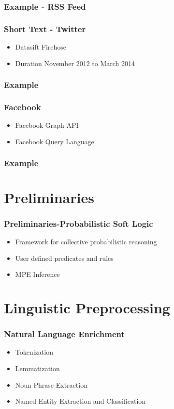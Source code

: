 \documentclass{beamer}
\begin{document}
\begin{frame}
    \frametitle{Example - RSS Feed}
\end{frame}

\begin{frame}
    \frametitle{Short Text - Twitter}
    \begin{itemize}
        \item
            Datasift Firehose
        \item
            Duration November 2012 to March 2014
    \end{itemize}
\end{frame}

\begin{frame}
    \frametitle{Example}
\end{frame}

\begin{frame}
    \frametitle{Facebook}
    \begin{itemize}
        \item
            Facebook Graph API
        \item
            Facebook Query Language
    \end{itemize}
\end{frame}

\begin{frame}
    \frametitle{Example}
\end{frame}

\section{Preliminaries}
\begin{frame}
\frametitle{Preliminaries-Probabilistic Soft Logic}
    \begin{itemize}
        \item
            Framework for collective probabilistic reasoning
        \item
            User defined predicates and rules
        \item
            MPE Inference
    \end{itemize}
\end{frame}

\section{Linguistic Preprocessing}
\begin{frame}
    \frametitle{Natural Language Enrichment}
    \begin{itemize}
        \item
            Tokenization
        \item
            Lemmatization
        \item
            Noun Phrase Extraction
        \item
            Named Entity Extraction and Classification
    \end{itemize}
\end{frame}
\end{document}
